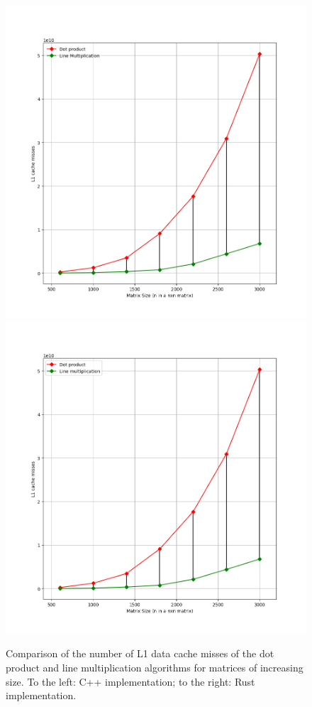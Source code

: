 \documentclass{report}
\begin{document}
				\begin{figure}[H]
					\begin{adjustbox}{center}
						\includegraphics[scale=0.4]{cpp_dot_line_l1.png}
						\includegraphics[scale=0.4]{rs_l1_misses.png}
					\end{adjustbox}
					\caption{Comparison of the number of L1 data cache misses of the dot product and line multiplication algorithms for matrices of increasing size. To the left: C++ implementation; to the right: Rust implementation.}
				\end{figure}
			
\end{document}
